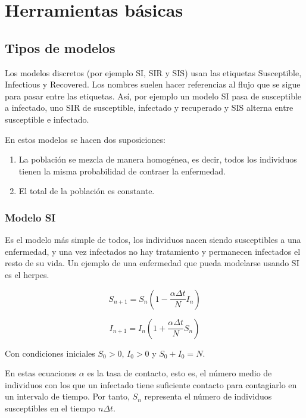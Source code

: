 \chapter{Herramientas básicas}

\section{Tipos de modelos}

Los modelos discretos (por ejemplo SI, SIR y SIS) usan las etiquetas Susceptible, Infectious y Recovered. Los nombres suelen hacer referencias al flujo que se sigue para pasar entre las etiquetas. Así, por ejemplo un modelo SI pasa de susceptible a infectado, uno SIR de susceptible, infectado y recuperado y SIS alterna entre susceptible e infectado.

En estos modelos se hacen dos suposiciones:
\begin{enumerate}
\item La población se mezcla de manera homogénea, es decir, todos los individuos tienen la misma probabilidad de contraer la enfermedad.
\item El total de la población es constante.
\end{enumerate}

\subsection{Modelo SI}
Es el modelo más simple de todos, los individuos nacen siendo susceptibles a una enfermedad, y una vez infectados no hay tratamiento y permanecen infectados el resto de su vida.
Un ejemplo de una enfermedad que pueda modelarse usando SI es el herpes.

\begin{equation}
\label{eqn: SI_S}
S_{n+1}=S_n\left( 1-\frac{\alpha\Delta t}{N}I_n\right)
\end{equation}

\begin{equation}
\label{eqn: SI_I}
I_{n+1}=I_n\left( 1+\frac{\alpha\Delta t}{N}S_n\right)
\end{equation}

Con condiciones iniciales $S_0>0$, $I_0>0$ y $S_0+I_0=N$.

En estas ecuaciones $\alpha$ es la tasa de contacto, esto es, el número medio de individuos con los que un infectado tiene suficiente contacto para contagiarlo en un intervalo de tiempo. Por tanto, $S_n$ representa el número de individuos susceptibles en el tiempo $n\Delta t$.

